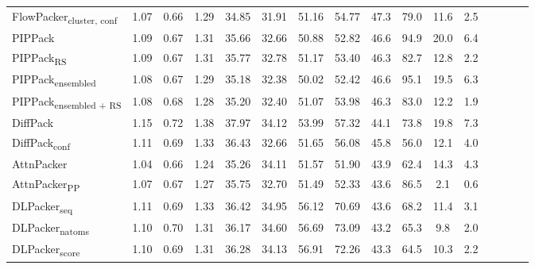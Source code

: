 \begin{table}
{\begin{tabular}{@{}lccccccccccccccc@{}}
                \textnormal{\hspace{0.5cm}FlowPacker\textsubscript{cluster, conf}} & 1.07 & 0.66 & 1.29 & 34.85 & 31.91 & 51.16 & 54.77 & 47.3 & 79.0 & 11.6 & 2.5 \\
                \textnormal{\hspace{0.5cm}PIPPack} & 1.09 & 0.67 & 1.31 & 35.66 & 32.66 & 50.88 & 52.82 & 46.6 & 94.9 & 20.0 & 6.4 \\
                \textnormal{\hspace{0.5cm}PIPPack\textsubscript{RS}} & 1.09 & 0.67 & 1.31 & 35.77 & 32.78 & 51.17 & 53.40 & 46.3 & 82.7 & 12.8 & 2.2 \\
                \textnormal{\hspace{0.5cm}PIPPack\textsubscript{ensembled}} & 1.08 & 0.67 & 1.29 & 35.18 & 32.38 & 50.02 & 52.42 & 46.6 & 95.1 & 19.5 & 6.3 \\
                \textnormal{\hspace{0.5cm}PIPPack\textsubscript{ensembled + RS}} & 1.08 & 0.68 & 1.28 & 35.20 & 32.40 & 51.07 & 53.98 & 46.3 & 83.0 & 12.2 & 1.9 \\
                \textnormal{\hspace{0.5cm}DiffPack} & 1.15 & 0.72 & 1.38 & 37.97 & 34.12 & 53.99 & 57.32 & 44.1 & 73.8 & 19.8 & 7.3 \\
                \textnormal{\hspace{0.5cm}DiffPack\textsubscript{conf}} & 1.11 & 0.69 & 1.33 & 36.43 & 32.66 & 51.65 & 56.08 & 45.8 & 56.0 & 12.1 & 4.0 \\
                \textnormal{\hspace{0.5cm}AttnPacker} & 1.04 & 0.66 & 1.24 & 35.26 & 34.11 & 51.57 & 51.90 & 43.9 & 62.4 & 14.3 & 4.3 \\
                \textnormal{\hspace{0.5cm}AttnPacker\textsubscript{PP}} & 1.07 & 0.67 & 1.27 & 35.75 & 32.70 & 51.49 & 52.33 & 43.6 & 86.5 & 2.1 & 0.6 \\
                \textnormal{\hspace{0.5cm}DLPacker\textsubscript{seq}} & 1.11 & 0.69 & 1.33 & 36.42 & 34.95 & 56.12 & 70.69 & 43.6 & 68.2 & 11.4 & 3.1 \\
                \textnormal{\hspace{0.5cm}DLPacker\textsubscript{natoms}} & 1.10 & 0.70 & 1.31 & 36.17 & 34.60 & 56.69 & 73.09 & 43.2 & 65.3 & 9.8 & 2.0 \\
                \textnormal{\hspace{0.5cm}DLPacker\textsubscript{score}} & 1.10 & 0.69 & 1.31 & 36.28 & 34.13 & 56.91 & 72.26 & 43.3 & 64.5 & 10.3 & 2.2 \\

\end{tabular}}
\end{table}
